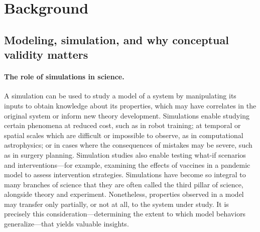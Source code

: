 \section{Background}

\subsection{Modeling, simulation, and why conceptual validity matters}
\label{sec:background_simulation}

\paragraph{The role of simulations in science.}
A simulation can be used to study a model of a system by manipulating its inputs to obtain knowledge about its properties, which may have correlates in the original system or inform new theory development. Simulations enable studying certain phenomena at reduced cost, such as in robot training; at temporal or spatial scales which are difficult or impossible to observe, as in computational astrophysics; or in cases where the consequences of mistakes may be severe, such as in surgery planning. Simulation studies also enable testing what-if scenarios and interventions—for example, examining the effects of vaccines in a pandemic model to assess intervention strategies.
Simulations have become so integral to many branches of science that they are often called the third pillar of science, alongside theory and experiment. Nonetheless, properties observed in a model may transfer only partially, or not at all, to the system under study. It is precisely this consideration—determining the extent to which model behaviors generalize—that yields valuable insights.

